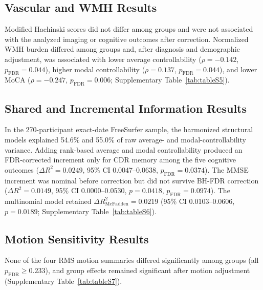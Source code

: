 \documentclass{article}
\begin{document}
\subsection{Vascular and WMH Results}
Modified Hachinski scores did not differ among groups and were not associated with the analyzed imaging or cognitive outcomes after correction. Normalized WMH burden differed among groups and, after diagnosis and demographic adjustment, was associated with lower average controllability (\(\rho=-0.142\), \(p_{\mathrm{FDR}}=0.044\)), higher modal controllability (\(\rho=0.137\), \(p_{\mathrm{FDR}}=0.044\)), and lower MoCA (\(\rho=-0.247\), \(p_{\mathrm{FDR}}=0.006\); Supplementary Table~\ref{tab:tableS5}).

\subsection{Shared and Incremental Information Results}
In the 270-participant exact-date FreeSurfer sample, the harmonized structural models explained 54.6\% and 55.0\% of raw average- and modal-controllability variance. Adding rank-based average and modal controllability produced an FDR-corrected increment only for CDR memory among the five cognitive outcomes (\(\Delta R^2=0.0249\), 95\% CI 0.0047--0.0638, \(p_{\mathrm{FDR}}=0.0374\)). The MMSE increment was nominal before correction but did not survive BH-FDR correction (\(\Delta R^2=0.0149\), 95\% CI 0.0000--0.0530, \(p=0.0418\), \(p_{\mathrm{FDR}}=0.0974\)). The multinomial model retained \(\Delta R^2_{\mathrm{McFadden}}=0.0219\) (95\% CI 0.0103--0.0606, \(p=0.0189\); Supplementary Table~\ref{tab:tableS6}).

\subsection{Motion Sensitivity Results}
None of the four RMS motion summaries differed significantly among groups (all \(p_{\mathrm{FDR}}\geq0.233\)), and group effects remained significant after motion adjustment (Supplementary Table~\ref{tab:tableS7}).
\end{document}
